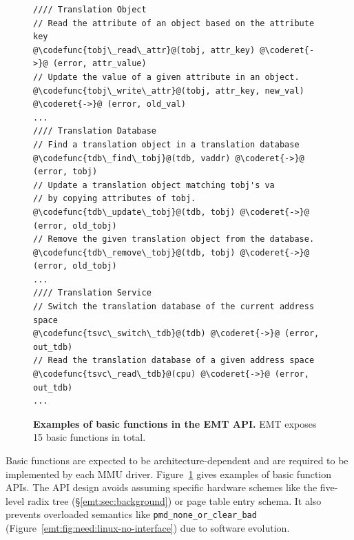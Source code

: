 \begin{figure}[H]
	\centering
\begin{singlespace}
\begin{verbatim}
//// Translation Object
// Read the attribute of an object based on the attribute key
@\codefunc{tobj\_read\_attr}@(tobj, attr_key) @\coderet{->}@ (error, attr_value)
// Update the value of a given attribute in an object.
@\codefunc{tobj\_write\_attr}@(tobj, attr_key, new_val) @\coderet{->}@ (error, old_val)
...
//// Translation Database
// Find a translation object in a translation database
@\codefunc{tdb\_find\_tobj}@(tdb, vaddr) @\coderet{->}@ (error, tobj)
// Update a translation object matching tobj's va 
// by copying attributes of tobj.
@\codefunc{tdb\_update\_tobj}@(tdb, tobj) @\coderet{->}@ (error, old_tobj)
// Remove the given translation object from the database.
@\codefunc{tdb\_remove\_tobj}@(tdb, tobj) @\coderet{->}@ (error, old_tobj)
...
//// Translation Service
// Switch the translation database of the current address space
@\codefunc{tsvc\_switch\_tdb}@(tdb) @\coderet{->}@ (error, out_tdb)
// Read the translation database of a given address space
@\codefunc{tsvc\_read\_tdb}@(cpu) @\coderet{->}@ (error, out_tdb)
...
\end{verbatim}
\end{singlespace}
\caption{{\bf Examples of basic functions in the EMT API.}
	EMT exposes 15 basic functions in total.}
\label{emt:fig:api}
\end{figure}

\noindent
Basic functions
	are expected to be architecture-dependent and 
	are required to be implemented by each MMU driver.
Figure~\ref{emt:fig:api} gives examples of basic function APIs.
The API design avoids 
	assuming specific hardware schemes like the five-level radix tree
	(\S\ref{emt:sec:background}) or page table entry schema.
It also prevents overloaded semantics like \texttt{\small pmd\_none\_or\_clear\_bad} (Figure~\ref{emt:fig:need:linux-no-interface})
	due to software evolution.

